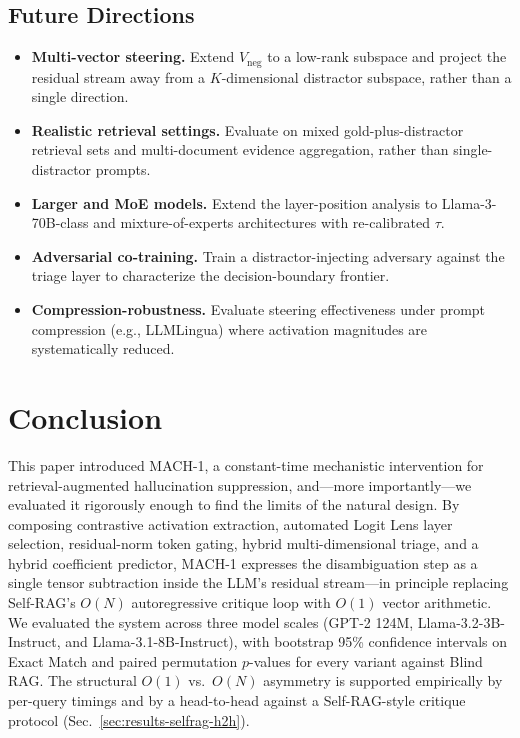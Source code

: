 \documentclass[conference]{IEEEtran}
\begin{document}
\subsection{Future Directions}

\begin{itemize}
    \item \textbf{Multi-vector steering.} Extend $V_{\text{neg}}$ to a low-rank subspace and project the residual stream away from a $K$-dimensional distractor subspace, rather than a single direction.
    \item \textbf{Realistic retrieval settings.} Evaluate on mixed gold-plus-distractor retrieval sets and multi-document evidence aggregation, rather than single-distractor prompts.
    \item \textbf{Larger and MoE models.} Extend the layer-position analysis to Llama-3-70B-class and mixture-of-experts architectures with re-calibrated $\tau$.
    \item \textbf{Adversarial co-training.} Train a distractor-injecting adversary against the triage layer to characterize the decision-boundary frontier.
    \item \textbf{Compression-robustness.} Evaluate steering effectiveness under prompt compression (e.g., LLMLingua) where activation magnitudes are systematically reduced.
\end{itemize}

\section{Conclusion}\label{sec:conclusion}

This paper introduced MACH-1, a constant-time mechanistic intervention for retrieval-augmented hallucination suppression, and---more importantly---we evaluated it rigorously enough to find the limits of the natural design. By composing contrastive activation extraction, automated Logit Lens layer selection, residual-norm token gating, hybrid multi-dimensional triage, and a hybrid coefficient predictor, MACH-1 expresses the disambiguation step as a single tensor subtraction inside the LLM's residual stream---in principle replacing Self-RAG's $O(N)$ autoregressive critique loop with $O(1)$ vector arithmetic. We evaluated the system across three model scales (GPT-2 124M, Llama-3.2-3B-Instruct, and Llama-3.1-8B-Instruct), with bootstrap 95\% confidence intervals on Exact Match and paired permutation $p$-values for every variant against Blind RAG. The structural $O(1)$ vs.\ $O(N)$ asymmetry is supported empirically by per-query timings and by a head-to-head against a Self-RAG-style critique protocol (Sec.~\ref{sec:results-selfrag-h2h}).
\end{document}

